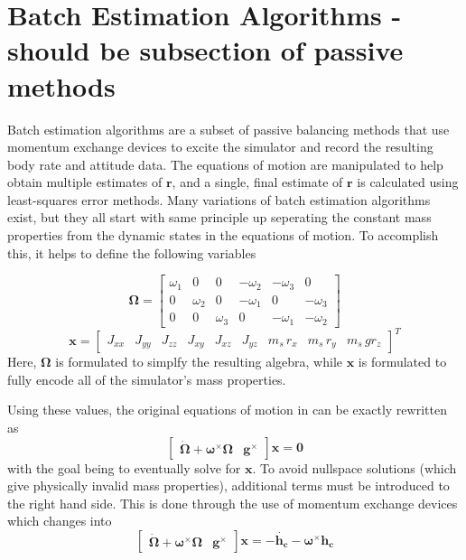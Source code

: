 \section{Batch Estimation Algorithms - should be subsection of passive methods}

Batch estimation algorithms are a subset of passive balancing methods that use momentum exchange devices to excite the simulator and record the resulting body rate and attitude data. The equations of motion are manipulated to help obtain multiple estimates of $\bm{r}$, and a single, final estimate of $\bm{r}$ is calculated using least-squares error methods. Many variations of batch estimation algorithms exist, but they all start with same principle up seperating the constant mass properties from the dynamic states in the equations of motion. To accomplish this, it helps to define the following variables

\begin{equation}
    \bm{\Omega} =
        \begin{bmatrix}
            \omega_1 & 0 & 0 & -\omega_2 & -\omega_3 & 0 \\
            0 & \omega_2 & 0 & -\omega_1 & 0 & -\omega_3 \\
            0 & 0 & \omega_3 & 0 & -\omega_1 & -\omega_2
        \end{bmatrix}
\end{equation}
\begin{equation}
    \bm{x} = \begin{bmatrix}
        J_{xx} & J_{yy} & J_{zz} & J_{xy} & J_{xz} & J_{yz} & m_s\,r_x & m_s\,r_y & m_s\,gr_z
    \end{bmatrix}^T
\end{equation}
Here, $\bm{\Omega}$ is formulated to simplfy the resulting algebra, while $\bm{x}$ is formulated to fully encode all of the simulator's mass properties.

Using these values, the original equations of motion in  can be exactly rewritten as 
\begin{equation}\label{equation:no_MEDs}
    \begin{bmatrix}
        \dot{\bm{\Omega}}+\bm{\omega}^{\times}\bm{\Omega} & \bm{g}^{\times}
    \end{bmatrix}\bm{x}
    =\bm{0}
\end{equation}
with the goal being to eventually solve for $\bm{x}$. To avoid nullspace solutions (which give physically invalid mass properties), additional terms must be introduced to the right hand side. This is done through the use of momentum exchange devices which changes  into 
\begin{equation}\label{equation:with_MEDs}
    \begin{bmatrix}
    \dot{\bm{\Omega}}+\bm{\omega}^{\times}\bm{\Omega} & \bm{g}^{\times}
    \end{bmatrix}\bm{x}
    =-\dot{\bm{h_c}} - \bm{\omega}^{\times}\bm{h_c}
\end{equation}

